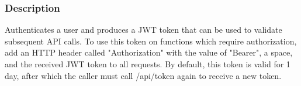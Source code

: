 \documentclass[12pt]{article}
\begin{document}
            \subsubsection{Description}
                Authenticates a user and produces a JWT token that can be used to validate subsequent API calls.
                To use this token on functions which require authorization, add an HTTP header called "Authorization" with the value of "Bearer", a space, and the received JWT token to all requests.
                By default, this token is valid for 1 day, after which the caller must call /api/token again to receive a new token.
            
\end{document}
